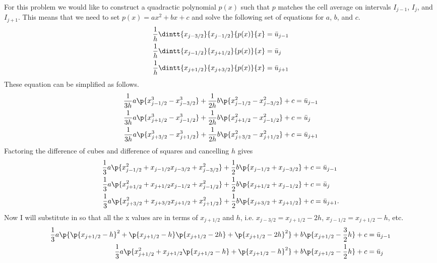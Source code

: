 \documentclass[11pt, oneside]{article}
\begin{document}
\begin{enumerate}
      For this problem we would like to construct a quadractic polynomial $p(x)$
      such that $p$ matches the cell average on intervals $I_{j-1}$, $I_j$, and
      $I_{j+1}$.
      This means that we need to set $p(x) = ax^2 + bx + c$ and solve the following set
      of equations for $a$, $b$, and $c$.
      \begin{align*}
        \frac{1}{h} \dintt{x_{j-3/2}}{x_{j-1/2}}{p(x)}{x} &= \bar{u}_{j-1} \\
        \frac{1}{h} \dintt{x_{j-1/2}}{x_{j+1/2}}{p(x)}{x} &= \bar{u}_{j} \\
        \frac{1}{h} \dintt{x_{j+1/2}}{x_{j+3/2}}{p(x)}{x} &= \bar{u}_{j+1}
      \end{align*}
      These equation can be simplified as follows.
      \begin{align*}
        \frac{1}{3h}a \p{x_{j-1/2}^3 - x_{j-3/2}^3} + \frac{1}{2h}b\p{x_{j-1/2}^2 - x_{j-3/2}^2} + c &= \bar{u}_{j-1} \\
        \frac{1}{3h}a \p{x_{j+1/2}^3 - x_{j-1/2}^3} + \frac{1}{2h}b\p{x_{j+1/2}^2 - x_{j-1/2}^2} + c &= \bar{u}_{j} \\
        \frac{1}{3h}a \p{x_{j+3/2}^3 - x_{j+1/2}^3} + \frac{1}{2h}b\p{x_{j+3/2}^2 - x_{j+1/2}^2} + c &= \bar{u}_{j+1}
      \end{align*}
      Factoring the difference of cubes and difference of squares and cancelling
      $h$ gives
      \begin{align*}
        \frac{1}{3}a \p{x_{j-1/2}^2 + x_{j-1/2}x_{j-3/2} +  x_{j-3/2}^2} + \frac{1}{2}b\p{x_{j-1/2} + x_{j-3/2}} + c &= \bar{u}_{j-1} \\
        \frac{1}{3}a \p{x_{j+1/2}^2 + x_{j+1/2}x_{j-1/2} +  x_{j-1/2}^2} + \frac{1}{2}b\p{x_{j+1/2} + x_{j-1/2}} + c &= \bar{u}_{j} \\
        \frac{1}{3}a \p{x_{j+3/2}^2 + x_{j+3/2}x_{j+1/2} +  x_{j+1/2}^2} + \frac{1}{2}b\p{x_{j+3/2} + x_{j+1/2}} + c &= \bar{u}_{j+1}.
      \end{align*}
      Now I will substitute in so that all the x values are in terms of
      $x_{j+1/2}$ and $h$, i.e. $x_{j-3/2} = x_{j+1/2} - 2h$,
      $x_{j-1/2} = x_{j+1/2} - h$, etc.
      \begin{align*}
        \frac{1}{3}a \p{\p{x_{j+1/2} - h}^2 + \p{x_{j+1/2} - h}\p{x_{j+1/2} - 2h} +  \p{x_{j+1/2} - 2h}^2} + b\p{x_{j+1/2} - \frac{3}{2}h} + c &= \bar{u}_{j-1} \\
        \frac{1}{3}a \p{x_{j+1/2}^2 + x_{j+1/2}\p{x_{j+1/2} - h} +  \p{x_{j+1/2} - h}^2} + b\p{x_{j+1/2} - \frac{1}{2}h} + c &= \bar{u}_{j} \\

\end{align*}
\end{enumerate}
\end{document}
